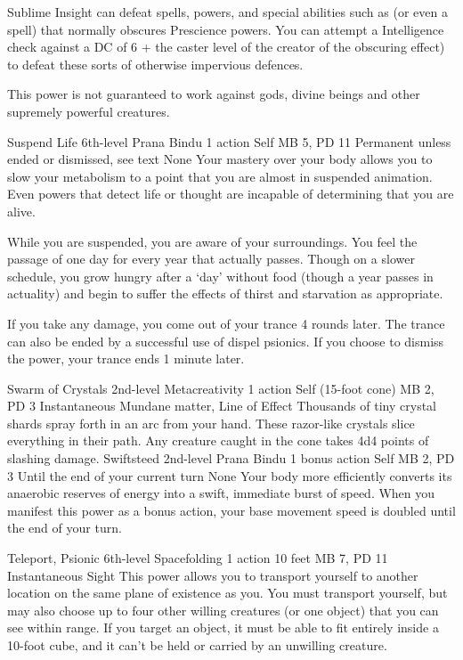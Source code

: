 Sublime Insight can defeat spells,
powers,
and special abilities such as 
(or even a  spell)
that normally obscures Prescience powers.
You can attempt a Intelligence check against
a DC of 6 + the caster level of the
creator of the obscuring effect)
to defeat these sorts of otherwise impervious defences.

This power is not guaranteed to work against gods, divine beings
and other supremely powerful creatures.

\DndPowerHeader%
    {Suspend Life\label{pwr:suspend_life}}
    {6th-level Prana Bindu}
    {1 action}
    {Self}
    {MB 5, PD 11}
    {Permanent unless ended or dismissed, see text}
    {None}
Your mastery over your body allows you to
slow your metabolism to a point that you are almost in suspended
animation. Even powers that detect life or thought are incapable
of determining that you are alive.

While you are suspended, you are aware of your surroundings.
You feel the passage of one day for every year that actually
passes. Though on a slower schedule, you grow hungry after
a `day' without food (though a year passes in actuality)
and begin to suffer the effects of thirst and starvation as
appropriate.

If you take any damage, you come out of your trance 4 rounds
later. The trance can also be ended by a successful use of
dispel psionics. If you choose to dismiss the power, your
trance ends 1 minute later.

\DndPowerHeader%
    {Swarm of Crystals\label{pwr:swarm_of_crystals}}
    {2nd-level Metacreativity}
    {1 action}
    {Self (15-foot cone)}
    {MB 2, PD 3}
    {Instantaneous}
    {Mundane matter, Line of Effect}
Thousands of tiny crystal shards spray forth
in an arc from your hand. These razor-like crystals slice
everything in their path. Any creature caught in the cone
takes 4d4 points of slashing damage.
\DndPowerHeader%
    {Swiftsteed\label{pwr:swiftsteed}}
    {2nd-level Prana Bindu}
    {1 bonus action}
    {Self}
    {MB 2, PD 3}
    {Until the end of your current turn}
    {None}
Your body more efficiently converts its anaerobic
reserves of energy into a swift, immediate burst of speed.
When you manifest this power as a bonus action, your base
movement speed is doubled until the end of your turn.

\DndPowerHeader%
    {Teleport, Psionic\label{pwr:teleport_psionic}}
    {6th-level Spacefolding}
    {1 action}
    {10 feet}
    {MB 7, PD 11}
    {Instantaneous}
    {Sight}
This power allows you to transport yourself to another location
on the same plane of existence as you.
You must transport yourself,
but may also choose up to four other willing creatures (or one object)
that you can see within range.
If you target an object, it must be able to fit entirely inside
a 10-foot cube, and it can't be held or carried by an unwilling creature.


